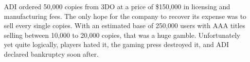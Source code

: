 \par
ADI ordered 50,000 copies from 3DO at a price of \$150,000 in licensing and manufacturing fees. The only hope for the company to recover its expense was to sell every single copies. With an estimated base of 250,000 users with AAA titles selling between 10,000 to 20,000 copies, that was a huge gamble. Unfortunately yet quite logically, players hated it, the gaming press destroyed it, and ADI declared bankruptcy soon after. \\
\par
{}\\
\par




